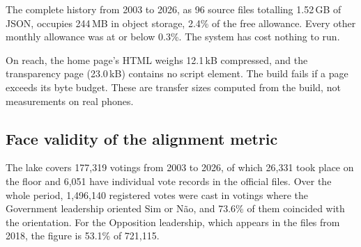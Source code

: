 The complete history from 2003 to 2026, as 96 source files totalling 1.52\,GB of JSON, occupies 244\,MB in object storage, 2.4\% of the free allowance. Every other monthly allowance was at or below 0.3\%. The system has cost nothing to run.

On reach, the home page's HTML weighs 12.1\,kB compressed, and the transparency page (23.0\,kB) contains no script element. The build fails if a page exceeds its byte budget. These are transfer sizes computed from the build, not measurements on real phones.

\subsection{Face validity of the alignment metric}
\label{sec:eval-face}

The lake covers 177,319 votings from 2003 to 2026, of which 26,331 took place on the floor and 6,051 have individual vote records in the official files. Over the whole period, 1,496,140 registered votes were cast in votings where the Government leadership oriented Sim or N\~ao, and 73.6\% of them coincided with the orientation. For the Opposition leadership, which appears in the files from 2018, the figure is 53.1\% of 721,115.

